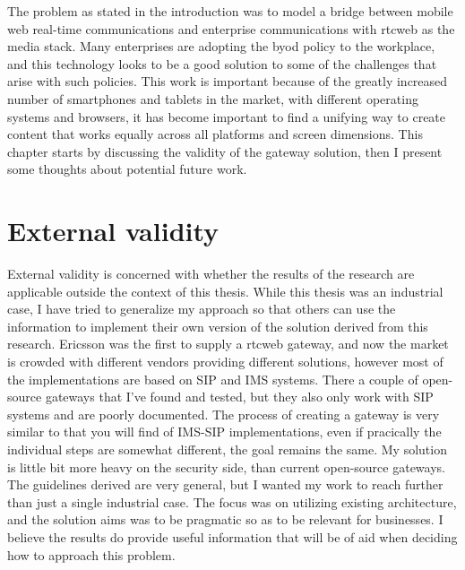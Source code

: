 
The problem as stated in the introduction was to model a bridge between mobile web real-time communications and enterprise communications with \gls{rtcweb} as the media stack. Many enterprises are adopting the \gls{byod} policy to the workplace, and this technology looks to be a good solution to some of the challenges that arise with such policies. This work is important because of the greatly increased number of smartphones and tablets in the market, with different operating systems and browsers, it has become important to find a unifying way to create content that works equally across all platforms and screen dimensions. This chapter starts by discussing the validity of the gateway solution, then I present some thoughts about potential future work.


\section{External validity}
External validity is concerned with whether the results of the research are applicable outside the context of this thesis. While this thesis was an industrial case, I have tried to generalize my approach so that others can use the information to implement their own version of the solution derived from this research. Ericsson was the first to supply a \gls{rtcweb} gateway, and now the market is crowded with different vendors providing different solutions, however most of the implementations are based on SIP and IMS systems. There a couple of open-source gateways that I've found and tested, but they also only work with SIP systems and are poorly documented. The process of creating a gateway is very similar to that you will find of IMS-SIP implementations, even if pracically the individual steps are somewhat different, the goal remains the same. My solution is little bit more heavy on the security side, than current open-source gateways. The guidelines derived are very general, but I wanted my work to reach further than just a single industrial case. The focus was on utilizing existing architecture, and the solution aims was to be pragmatic so as to be relevant for businesses. I believe the results do provide useful information that will be of aid when deciding how to approach this problem.

